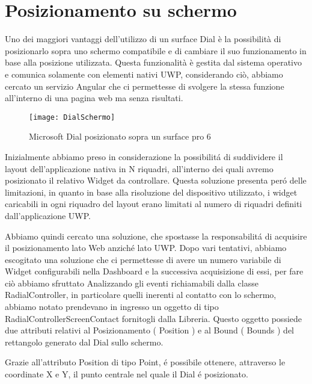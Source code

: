 \chapter{Posizionamento su schermo}
\label{chap:Screen}

Uno dei maggiori vantaggi dell’utilizzo di un surface Dial è la possibilità di posizionarlo sopra uno schermo compatibile e di cambiare il suo funzionamento in base alla posizione utilizzata.
Questa funzionalità è gestita dal sistema operativo e comunica solamente con elementi nativi UWP, considerando ciò, abbiamo cercato un servizio Angular che ci permettesse di svolgere la stessa funzione all’interno di una pagina web ma senza risultati.
\begin{figure}[htpb!]
  \centering
  \texttt{[image: DialSchermo]}
  \caption{Microsoft Dial posizionato sopra un surface pro 6}
\end{figure}
Inizialmente abbiamo preso in considerazione la possibilitá di suddividere il layout dell’applicazione nativa in N riquadri, all’interno dei quali avremo posizionato il relativo Widget da controllare. Questa soluzione presenta peró delle limitazioni, in quanto in base alla risoluzione del dispositivo utilizzato, i widget caricabili in ogni riquadro del layout erano limitati al numero di riquadri definiti dall’applicazione UWP.

Abbiamo quindi cercato una soluzione, che spostasse la responsabilitá di acquisire il posizionamento lato Web anziché lato UWP. Dopo vari tentativi, abbiamo escogitato una soluzione che ci permettesse di avere un numero variabile di Widget configurabili nella Dashboard e la successiva acquisizione di essi, per fare ciò abbiamo sfruttato
Analizzando gli eventi richiamabili dalla classe RadialController, in particolare quelli inerenti al contatto con lo schermo, abbiamo notato prendevano in ingresso un oggetto di tipo RadialControllerScreenContact fornitogli dalla Libreria. Questo oggetto possiede due attributi relativi al Posizionamento ( Position ) e al Bound ( Bounds ) del rettangolo generato dal Dial sullo schermo.

Grazie all’attributo Position di tipo Point, é possibile ottenere, attraverso le coordinate X e Y, il punto centrale nel quale il Dial é posizionato.

